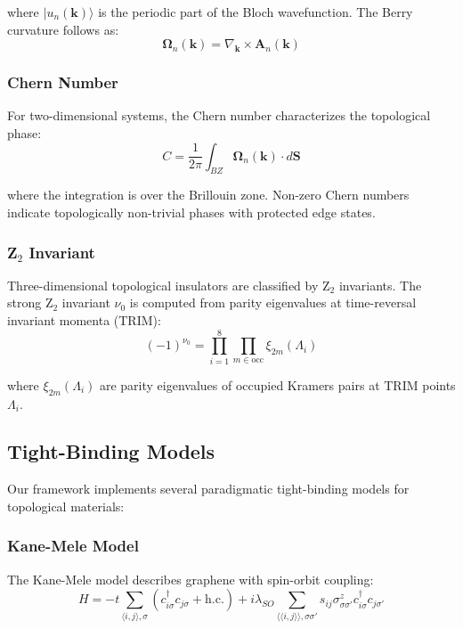\documentclass[12pt,a4paper]{article}
\begin{document}
where $|u_n(\mathbf{k})\rangle$ is the periodic part of the Bloch wavefunction. The Berry curvature follows as:
\begin{equation}
\boldsymbol{\Omega}_n(\mathbf{k}) = \nabla_{\mathbf{k}} \times \mathbf{A}_n(\mathbf{k})
\end{equation}

\subsubsection{Chern Number}

For two-dimensional systems, the Chern number characterizes the topological phase:
\begin{equation}
C = \frac{1}{2\pi} \int_{BZ} \boldsymbol{\Omega}_n(\mathbf{k}) \cdot d\mathbf{S}
\end{equation}

where the integration is over the Brillouin zone. Non-zero Chern numbers indicate topologically non-trivial phases with protected edge states.

\subsubsection{Z$_2$ Invariant}

Three-dimensional topological insulators are classified by Z$_2$ invariants. The strong Z$_2$ invariant $\nu_0$ is computed from parity eigenvalues at time-reversal invariant momenta (TRIM):
\begin{equation}
(-1)^{\nu_0} = \prod_{i=1}^{8} \prod_{m \in \text{occ}} \xi_{2m}(\Lambda_i)
\end{equation}

where $\xi_{2m}(\Lambda_i)$ are parity eigenvalues of occupied Kramers pairs at TRIM points $\Lambda_i$.

\subsection{Tight-Binding Models}

Our framework implements several paradigmatic tight-binding models for topological materials:

\subsubsection{Kane-Mele Model}

The Kane-Mele model describes graphene with spin-orbit coupling:
\begin{equation}
H = -t\sum_{\langle i,j \rangle, \sigma} (c_{i\sigma}^\dagger c_{j\sigma} + \text{h.c.}) + i\lambda_{SO}\sum_{\langle\langle i,j \rangle\rangle, \sigma\sigma'} s_{ij} \sigma^z_{\sigma\sigma'} c_{i\sigma}^\dagger c_{j\sigma'}
\end{equation}
\end{document}
